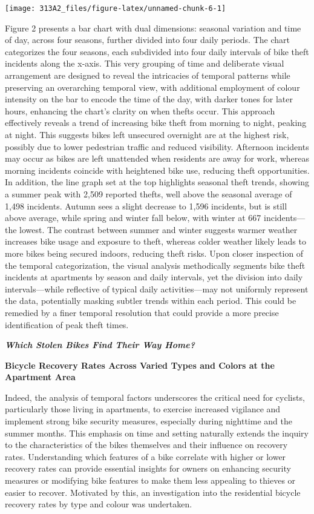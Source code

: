 \documentclass[
  11pt,
]{article}
\begin{document}
\begin{center}\texttt{[image: 313A2\_files/figure-latex/unnamed-chunk-6-1]} \end{center}

\indent Figure 2 presents a bar chart with dual dimensions: seasonal
variation and time of day, across four seasons, further divided into
four daily periods. The chart categorizes the four seasons, each
subdivided into four daily intervals of bike theft incidents along the
x-axis. This very grouping of time and deliberate visual arrangement are
designed to reveal the intricacies of temporal patterns while preserving
an overarching temporal view, with additional employment of colour
intensity on the bar to encode the time of the day, with darker tones
for later hours, enhancing the chart's clarity on when thefts occur.
This approach effectively reveals a trend of increasing bike theft from
morning to night, peaking at night. This suggests bikes left unsecured
overnight are at the highest risk, possibly due to lower pedestrian
traffic and reduced visibility. Afternoon incidents may occur as bikes
are left unattended when residents are away for work, whereas morning
incidents coincide with heightened bike use, reducing theft
opportunities. In addition, the line graph set at the top highlights
seasonal theft trends, showing a summer peak with 2,509 reported thefts,
well above the seasonal average of 1,498 incidents. Autumn sees a slight
decrease to 1,596 incidents, but is still above average, while spring
and winter fall below, with winter at 667 incidents---the lowest. The
contrast between summer and winter suggests warmer weather increases
bike usage and exposure to theft, whereas colder weather likely leads to
more bikes being secured indoors, reducing theft risks. Upon closer
inspection of the temporal categorization, the visual analysis
methodically segments bike theft incidents at apartments by season and
daily intervals, yet the division into daily intervals---while
reflective of typical daily activities---may not uniformly represent the
data, potentially masking subtler trends within each period. This could
be remedied by a finer temporal resolution that could provide a more
precise identification of peak theft times.

\textit{\textbf{{Which Stolen Bikes Find Their Way Home? }}}

\textbf{\footnotesize{Bicycle Recovery Rates Across Varied Types and Colors at the Apartment Area}}

\indent Indeed, the analysis of temporal factors underscores the
critical need for cyclists, particularly those living in apartments, to
exercise increased vigilance and implement strong bike security
measures, especially during nighttime and the summer months. This
emphasis on time and setting naturally extends the inquiry to the
characteristics of the bikes themselves and their influence on recovery
rates. Understanding which features of a bike correlate with higher or
lower recovery rates can provide essential insights for owners on
enhancing security measures or modifying bike features to make them less
appealing to thieves or easier to recover. Motivated by this, an
investigation into the residential bicycle recovery rates by type and
colour was undertaken.
\end{document}

